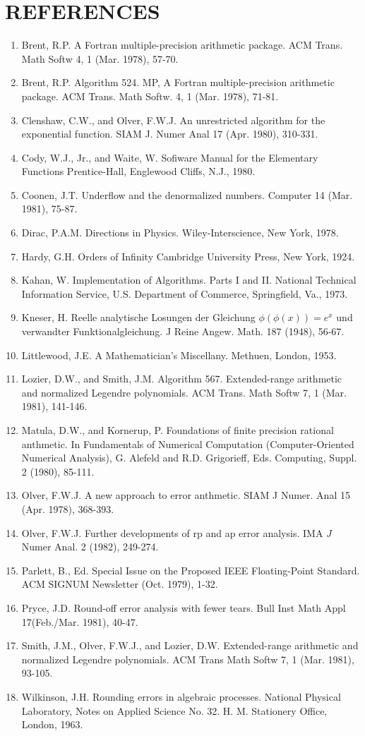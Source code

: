 \documentclass[10pt]{article}
\begin{document}
\section*{REFERENCES}
\begin{enumerate}
  \item Brent, R.P. A Fortran multiple-precision arithmetic package. ACM Trans. Math Softw 4, 1 (Mar. 1978), 57-70.
  \item Brent, R.P. Algorithm 524. MP, A Fortran multiple-precision arithmetic package. ACM Trans. Math Softw. 4, 1 (Mar. 1978), 71-81.
  \item Clenshaw, C.W., and Olver, F.W.J. An unrestricted algorithm for the exponential function. SIAM J. Numer Anal 17 (Apr. 1980), 310-331.
  \item Cody, W.J., Jr., and Waite, W. Sofiware Manual for the Elementary Functions Prentice-Hall, Englewood Cliffs, N.J., 1980.
  \item Coonen, J.T. Underflow and the denormalized numbers. Computer 14 (Mar. 1981), 75-87.
  \item Dirac, P.A.M. Directions in Physics. Wiley-Interscience, New York, 1978.
  \item Hardy, G.H. Orders of Infinity Cambridge University Press, New York, 1924.
  \item Kahan, W. Implementation of Algorithms. Parts I and II. National Technical Information Service, U.S. Department of Commerce, Springfield, Va., 1973.
  \item Kneser, H. Reelle analytische Losungen der Gleichung $\phi(\phi(x))=e^{x}$ und verwandter Funktionalgleichung. J Reine Angew. Math. 187 (1948), 56-67.
  \item Littlewood, J.E. A Mathematician's Miscellany. Methuen, London, 1953.
  \item Lozier, D.W., and Smith, J.M. Algorithm 567. Extended-range arithmetic and normalized Legendre polynomials. ACM Trans. Math Softw 7, 1 (Mar. 1981), 141-146.
  \item Matula, D.W., and Kornerup, P. Foundations of finite precision rational anthmetic. In Fundamentals of Numerical Computation (Computer-Oriented Numerical Analysis), G. Alefeld and R.D. Grigorieff, Eds. Computing, Suppl. 2 (1980), 85-111.
  \item Olver, F.W.J. A new approach to error anthmetic. SIAM J Numer. Anal 15 (Apr. 1978), 368-393.
  \item Olver, F.W.J. Further developments of rp and ap error analysis. IMA $J$ Numer Anal. 2 (1982), 249-274.
  \item Parlett, B., Ed. Special Issue on the Proposed IEEE Floating-Point Standard. ACM SIGNUM Newsletter (Oct. 1979), 1-32.
  \item Pryce, J.D. Round-off error analysis with fewer tears. Bull Inst Math Appl 17(Feb./Mar. 1981), 40-47.
  \item Smith, J.M., Olver, F.W.J., and Lozier, D.W. Extended-range arithmetic and normalized Legendre polynomials. ACM Trans Math Softw 7, 1 (Mar. 1981), 93-105.
  \item Wilkinson, J.H. Rounding errors in algebraic processes. National Physical Laboratory, Notes on Applied Science No. 32. H. M. Stationery Office, London, 1963.
\end{enumerate}
\end{document}
